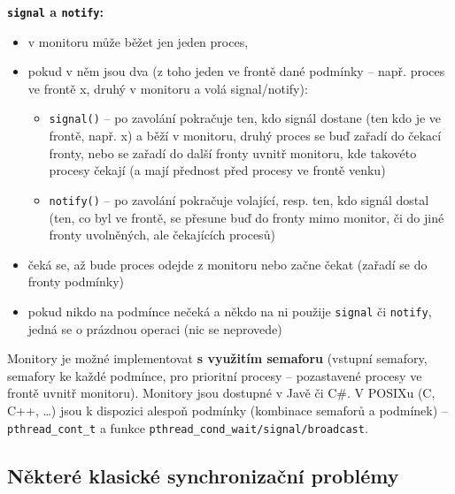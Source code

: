 \documentclass[a4paper, 11pt]{article}
\newcommand{\tcmd}[1]{\texttt{#1}}
\begin{document}
\textbf{\tcmd{signal} a \tcmd{notify}:}
\begin{itemize}
    \item v monitoru může běžet jen jeden proces,
    \item pokud v něm jsou dva (z toho jeden ve frontě dané podmínky -- např. proces ve frontě x, druhý v monitoru a volá signal/notify):
    \begin{itemize}
        \item \tcmd{signal()} -- po zavolání pokračuje ten, kdo signál dostane (ten kdo je ve frontě, např. x) a běží v monitoru, druhý proces se buď zařadí do čekací fronty, nebo se zařadí do další fronty uvnitř monitoru, kde takovéto procesy čekají (a mají přednost před procesy ve frontě venku)
        \item \tcmd{notify()} -- po zavolání pokračuje volající, resp. ten, kdo signál dostal (ten, co byl ve frontě, se přesune buď do fronty mimo monitor, či do jiné fronty uvolněných, ale čekajících procesů)
    \end{itemize}
    
    \item čeká se, až bude proces odejde z monitoru nebo začne čekat (zařadí se do fronty podmínky)
    \item pokud nikdo na podmínce nečeká a někdo na ni použije \tcmd{signal} či \tcmd{notify}, jedná se o prázdnou operaci (nic se neprovede)
\end{itemize}

Monitory je možné implementovat \textbf{s využitím semaforu} (vstupní semafory, semafory ke každé podmínce, pro prioritní procesy -- pozastavené procesy ve frontě uvnitř monitoru). Monitory jsou dostupné v Javě či C\#. V POSIXu (C, C++, \ldots) jsou k dispozici alespoň podmínky (kombinace semaforů a podmínek) -- \tcmd{pthread\_cont\_t} a funkce \tcmd{pthread\_cond\_wait/signal/broadcast}.

\subsection{Některé klasické synchronizační problémy}
\end{document}
